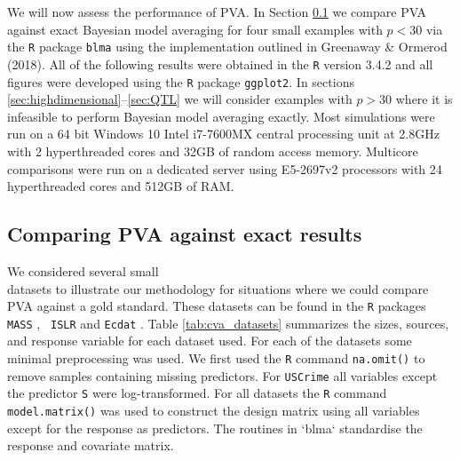 We will now assess the performance of PVA. In Section \ref{sec:exact} we
compare PVA against exact Bayesian model averaging for four small examples with
$p<30$ via the {\tt R} package {\tt blma} using the implementation outlined in
Greenaway \& Ormerod (2018). All of the following results were obtained in the
{\tt R} version 3.4.2 \citep{CiteR} and all figures were developed using the
{\tt R} package {\tt ggplot2}.  In sections
\ref{sec:highdimensional}--\ref{sec:QTL} we will consider examples with $p>30$
where it is infeasible to perform Bayesian model averaging exactly.  Most
simulations were run on a 64 bit Windows 10 Intel i7-7600MX central processing
unit at 2.8GHz with 2 hyperthreaded cores and 32GB of random access memory.
Multicore comparisons were run on a dedicated server using E5-2697v2 processors
with 24 hyperthreaded cores and 512GB of RAM.

\subsection{Comparing PVA against exact results} 
\label{sec:exact}

We considered several small \\ datasets to illustrate our methodology for
situations where we could compare PVA against a gold standard. These datasets
can be found in the {\tt R} packages {\tt MASS} \citep{Venables2002},  {\tt
ISLR} \cite{James:2014:ISL:2517747} and {\tt Ecdat} \citep{Croissant2016}.
Table \ref{tab:cva_datasets} summarizes the sizes,  sources, and response
variable for each dataset used.   For each of the datasets some minimal
preprocessing was used.  We first used the {\tt R} command {\tt na.omit()} to
remove samples containing missing predictors.  For {\tt USCrime} all variables
except the predictor {\tt S} were log-transformed. For all datasets the {\tt R}
command {\tt model.matrix()} was used to construct the design matrix using all
variables except for the response as predictors. The routines in `blma`
standardise the response and covariate matrix.

